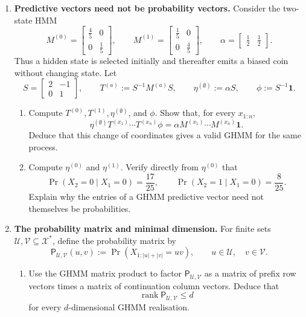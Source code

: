 \documentclass[11pt]{article}
\begin{document}
\begin{exercise}
\begin{enumerate}
    \item \textbf{Predictive vectors need not be probability vectors.}
      Consider the two-state HMM
      \[
        M^{(0)}=
          \begin{bmatrix}\tfrac45&0\\0&\tfrac15\end{bmatrix},
        \qquad
        M^{(1)}=
          \begin{bmatrix}\tfrac15&0\\0&\tfrac45\end{bmatrix},
        \qquad
        \alpha=\begin{bmatrix}\tfrac12&\tfrac12\end{bmatrix}.
      \]
      Thus a hidden state is selected initially and thereafter emits a biased
      coin without changing state. Let
      \[
        S=\begin{bmatrix}2&-1\\0&1\end{bmatrix},
        \qquad
        T^{(a)}:=S^{-1}M^{(a)}S,\qquad
        \eta^{(\emptyset)}:=\alpha S,\qquad
        \phi:=S^{-1}\mathbf 1.
      \]
      \begin{enumerate}
        \item Compute $T^{(0)},T^{(1)},\eta^{(\emptyset)}$, and $\phi$.
          Show that, for every $x_{1:n}$,
          \[
            \eta^{(\emptyset)}
              T^{(x_1)}\cdots T^{(x_n)}\phi
              =
            \alpha M^{(x_1)}\cdots M^{(x_n)}\mathbf 1.
          \]
          Deduce that this change of coordinates gives a valid GHMM for the
          same process.

        \item Compute $\eta^{(0)}$ and $\eta^{(1)}$. Verify directly from
          $\eta^{(0)}$ that
          \[
            \Pr(X_2=0\mid X_1=0)=\frac{17}{25},
            \qquad
            \Pr(X_2=1\mid X_1=0)=\frac8{25}.
          \]
          Explain why the entries of a GHMM predictive vector need not
          themselves be probabilities.
      \end{enumerate}

    \item \textbf{The probability matrix and minimal dimension.}
      For finite sets $\mathcal U,\mathcal V\subseteq\mathcal X^*$, define
      the probability matrix by
      \[
        \mathsf P_{\mathcal U,\mathcal V}(u,v)
          :=\Pr(X_{1:|u|+|v|}=uv),
        \qquad u\in\mathcal U,\quad v\in\mathcal V.
      \]
      \begin{enumerate}
        \item Use the GHMM matrix product to factor
          $\mathsf P_{\mathcal U,\mathcal V}$ as a matrix of prefix row
          vectors times a matrix of continuation column vectors. Deduce that
          \[
            \operatorname{rank}\mathsf P_{\mathcal U,\mathcal V}\leq d
          \]
          for every $d$-dimensional GHMM realisation.


\end{enumerate}
\end{enumerate}
\end{exercise}
\end{document}
